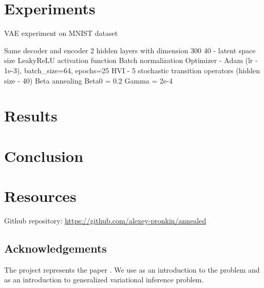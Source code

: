 \documentclass[a4paper]{article}
\begin{document}
\section{Experiments}

VAE experiment on MNIST dataset

Same decoder and encoder
2 hidden layers with dimension 300
40 - latent space size
LeakyReLU activation function
Batch normalization
Optimizer - Adam (lr - 1e-3), batch_size=64, epochs=25
HVI - 5 stochastic transition operators (hidden size - 40)
Beta annealing
Beta0 = 0.2
Gamma  = 2e-4




\section{Results}

\section{Conclusion}


\section{Resources}

Github repository:
\url{https://github.com/alexey-pronkin/annealed}


\subsection*{Acknowledgements}

The project represents the paper \cite{main_Huang2018ImprovingEI}.
We use \cite{lucas2019understanding} as an introduction to the problem and \cite{Knoblauch2019GeneralizedVI} as an introduction to generalized variational inference problem. 
\end{document}
